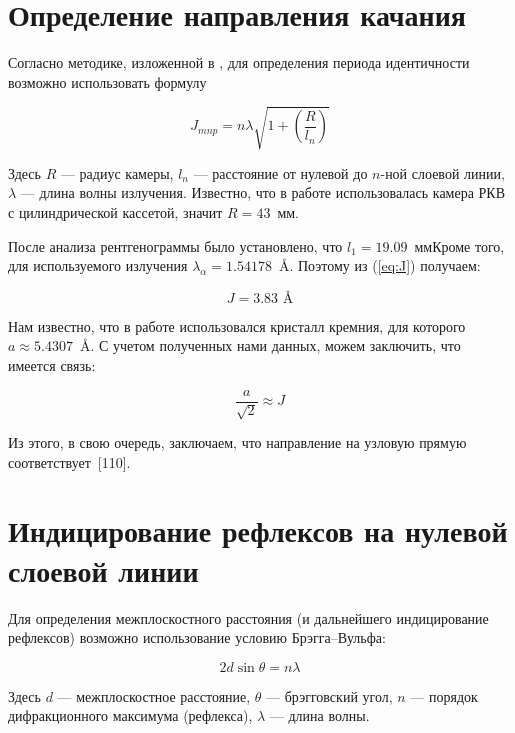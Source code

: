 \documentclass[a4paper, 12pt]{article}
\begin{document}
\section{Определение направления качания}

Согласно методике, изложенной в \cite{Practicum}, для определения периода идентичности возможно использовать формулу

\begin{equation}
	J_{mnp} = n \lambda \sqrt{1 + \left(\frac{R}{l_n}\right)}
	\label{eq:J}
\end{equation}

Здесь $R$ --- радиус камеры, $l_n$ --- расстояние от нулевой до $n$-ной слоевой линии, $\lambda$ --- длина волны излучения. Известно, что в работе использовалась камера РКВ с цилиндрической кассетой, значит $R = 43$~мм.

После анализа рентгенограммы было установлено, что $l_1 = 19.09$~ммКроме того, для используемого излучения $\lambda_\alpha = 1.54178$~\AA. Поэтому из (\ref{eq:J}) получаем:

\begin{equation}
	 \boxed{J = 3.83 \text{ \AA}}
\end{equation}

Нам известно, что в работе использовался кристалл кремния, для которого $a \approx 5.4307$~\AA. С учетом полученных нами данных, можем заключить, что имеется связь:

\begin{equation}
	\frac{a}{\sqrt{2}} \approx J
\end{equation}

Из этого, в свою очередь, заключаем, что направление на узловую прямую соответствует~[110].

\section{Индицирование рефлексов на нулевой слоевой линии}

Для определения межплоскостного расстояния (и дальнейшего индицирование рефлексов) возможно использование условию Брэгга--Вульфа:

\begin{equation}
	2 d \sin\theta = n\lambda
\end{equation}

Здесь $d$ --- межплоскостное расстояние, $\theta$ --- брэгговский угол, $n$ --- порядок дифракционного максимума (рефлекса), $\lambda$ --- длина волны.
\end{document}
